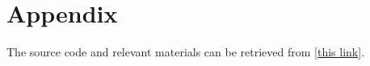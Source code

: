 \appendix
\chapter{Appendix}
The source code and relevant materials can be retrieved from \href{https://github.com/SnowzTail/signal-optimization-for-wireless-information-and-power-transmission}{[this link]}. 